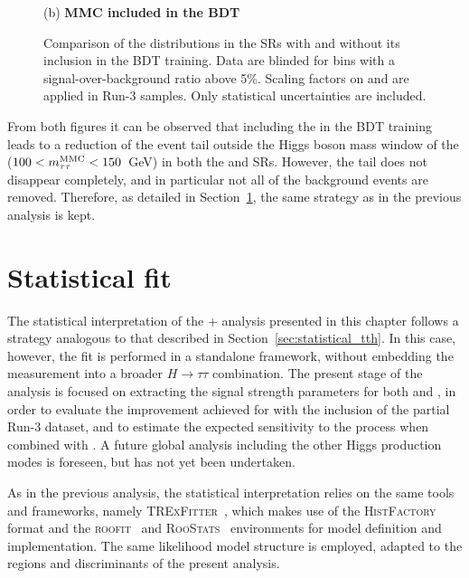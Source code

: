 \begin{figure}[htbp]
  \vspace{0.2cm}
  \begin{minipage}{\textwidth}
    \centering
    \small {(b) \textbf{MMC included in the BDT}}
  \end{minipage}
  \vspace{0.35cm}
  \caption{Comparison of the \mmc distributions in the \thqb SRs with and without its inclusion in the BDT training. Data are blinded for bins with a signal-over-background ratio above 5\%. Scaling factors on \ztautau and \ttbar are applied in Run-3 samples. Only statistical uncertainties are included.}
  \label{mmc_distributions_th}
\end{figure}
From both figures it can be observed that including the \mmc in the BDT training leads to a reduction of the event tail outside the Higgs boson mass window of the \mmc ($100 < m^\text{MMC}_{\tau\tau} < 150$~GeV) in both the \thqb and \ttH SRs. However, the tail does not disappear completely, and in particular not all of the \ttbar background events are removed. Therefore, as detailed in Section~\ref{statistical_th_tth}, the same strategy as in the previous analysis is kept.

\section{Statistical fit}
\label{statistical_th_tth}

The statistical interpretation of the \thqb + \ttH analysis presented in this chapter follows a strategy analogous to that described in Section~\ref{sec:statistical_tth}. In this case, however, the fit is performed in a standalone framework, without embedding the measurement into a broader $H \to \tau \tau$ combination. The present stage of the analysis is focused on extracting the signal strength parameters for both \thqb and \ttH, in order to evaluate the improvement achieved for \ttH with the inclusion of the partial Run-3 dataset, and to estimate the expected sensitivity to the \thqb process when combined with \ttH. A future global analysis including the other Higgs production modes is foreseen, but has not yet been undertaken.

As in the previous analysis, the statistical interpretation relies on the same tools and frameworks, namely \textsc{TRExFitter}~\cite{trexfitter}, which makes use of the \textsc{HistFactory}~\cite{histfactory} format and the \textsc{roofit}~\cite{roofit} and \textsc{RooStats}~\cite{roostats} environments for model definition and implementation. The same likelihood model structure is employed, adapted to the regions and discriminants of the present analysis.

